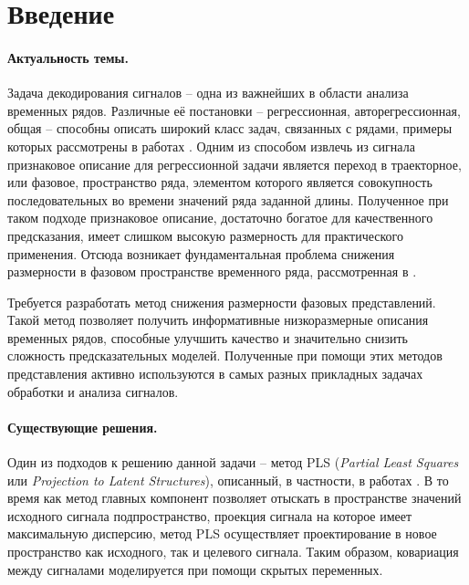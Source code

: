\documentclass[12pt]{article}
\begin{document}
\newpage


\section*{Введение}

\paragraph{Актуальность темы.} 
Задача декодирования сигналов -- одна из важнейших в области анализа временных рядов. Различные её постановки -- регрессионная, авторегрессионная, общая -- способны описать широкий класс задач, связанных с рядами, примеры которых рассмотрены в работах \cite{Grootswagers2017, Bao2017}. Одним из способом извлечь из сигнала признаковое описание для регрессионной задачи является переход в траекторное, или фазовое, пространство ряда, элементом которого является совокупность последовательных во времени значений ряда заданной длины. Полученное при таком подходе признаковое описание, достаточно богатое для качественного предсказания, имеет слишком высокую размерность для практического применения. Отсюда возникает фундаментальная проблема снижения размерности в фазовом пространстве временного ряда, рассмотренная в \cite{ISACHENKO2019, Motrenko2018, Katrutsa2017}.

Требуется разработать метод снижения размерности фазовых представлений. Такой метод позволяет получить информативные низкоразмерные описания временных рядов, способные улучшить качество и значительно снизить сложность предсказательных моделей. Полученные при помощи этих методов  представления активно используются в самых разных прикладных задачах обработки и анализа сигналов. 

\paragraph{Существующие решения.} 

Один из подходов к решению данной задачи -- метод PLS (\textit{Partial Least Squares} или \textit{Projection to Latent Structures}), описанный, в частности, в работах \cite{Haenlein2004, Geladi1988}. В то время как метод главных компонент позволяет отыскать в пространстве значений исходного сигнала подпространство, проекция сигнала на которое имеет максимальную дисперсию, метод PLS осуществляет проектирование в новое пространство как исходного, так и целевого сигнала. Таким образом, ковариация между сигналами моделируется при помощи скрытых переменных.
\end{document}

